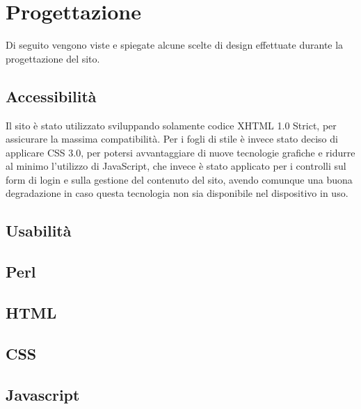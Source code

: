 \section{Progettazione}

Di seguito vengono viste e spiegate alcune scelte di design effettuate durante la progettazione del sito.

\subsection{Accessibilità}
Il sito è stato utilizzato sviluppando solamente codice XHTML 1.0 Strict, per assicurare la massima compatibilità. Per i fogli di stile è invece stato deciso di applicare CSS 3.0, per potersi avvantaggiare di nuove tecnologie grafiche e ridurre al minimo l'utilizzo di JavaScript, che invece è stato applicato per i controlli sul form di login e sulla gestione del contenuto del sito, avendo comunque una buona degradazione in caso questa tecnologia non sia disponibile nel dispositivo in uso.

\subsection{Usabilità}

\subsection{Perl}

\subsection{HTML}

\subsection{CSS}

\subsection{Javascript}
